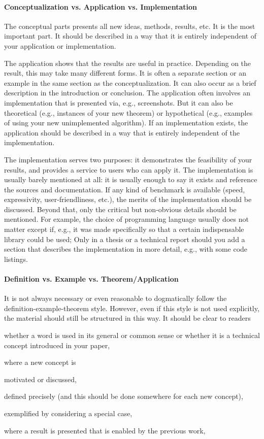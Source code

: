\documentclass[12pt]{article}
\begin{document}
\paragraph{Conceptualization vs. Application vs. Implementation}
The conceptual parts presents all new ideas, methods, results, etc.
It is the most important part.
It should be described in a way that it is entirely independent of your application or implementation.

The application shows that the results are useful in practice.
Depending on the result, this may take many different forms.
It is often a separate section or an example in the same section as the conceptualization.
It can also occur as a brief description in the introduction or conclusion.
The application often involves an implementation that is presented via, e.g., screenshots.
But it can also be theoretical (e.g., instances of your new theorem) or hypothetical (e.g., examples of using your new unimplemented algorithm).
If an implementation exists, the application should be described in a way that is entirely independent of the implementation.

The implementation serves two purposes: it demonstrates the feasibility of your results, and provides a service to users who can apply it.
The implementation is usually barely mentioned at all: it is usually enough to say it exists and reference the sources and documentation.
If any kind of benchmark is available (speed, expressivity, user-friendliness, etc.), the merits of the implementation should be discussed.
Beyond that, only the critical but non-obvious details should be mentioned.
For example, the choice of programming language usually does not matter except if, e.g., it was made specifically so that a certain indispensable library could be used; 
Only in a thesis or a technical report should you add a section that describes the implementation in more detail, e.g., with some code listings.

\paragraph{Definition vs. Example vs. Theorem/Application}
It is not always necessary or even reasonable to dogmatically follow the definition-example-theorem style.
However, even if this style is not used explicitly, the material should still be structured in this way.
It should be clear to readers
\begin{compactitem}
 \item whether a word is used in its general or common sense or whether it is a technical concept introduced in your paper,
 \item where a new concept is
  \begin{compactitem}
    \item motivated or discussed,
    \item defined precisely (and this should be done somewhere for each new concept),
    \item exemplified by considering a special case,
  \end{compactitem}
 \item where a result is presented that is enabled by the previous work,
\end{compactitem}
\end{document}
